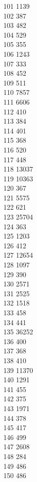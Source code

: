 { 101	1139 \\
 102	387 \\
 103	482 \\
 104	529 \\
 105	355 \\
 106	1243 \\
 107	333 \\
 108	452 \\
 109	511 \\
 110	7857 \\
 111	6606 \\
 112	410 \\
 113	384 \\
 114	401 \\
 115	368 \\
 116	520 \\
 117	448 \\
 118	13037 \\
 119	10363 \\
 120	367 \\
 121	5575 \\
 122	621 \\
 123	25704 \\
 124	363 \\
 125	1203 \\
 126	412 \\
 127	12654 \\
 128	1097 \\
 129	390 \\
 130	2571 \\
 131	2525 \\
 132	1518 \\
 133	458 \\
 134	441 \\
 135	36252 \\
 136	400 \\
 137	368 \\
 138	410 \\
 139	11370 \\
 140	1291 \\
 141	455 \\
 142	375 \\
 143	1971 \\
 144	378 \\
 145	417 \\
 146	499 \\
 147	2608 \\
 148	284 \\
 149	486 \\
 150	486 \\
}
